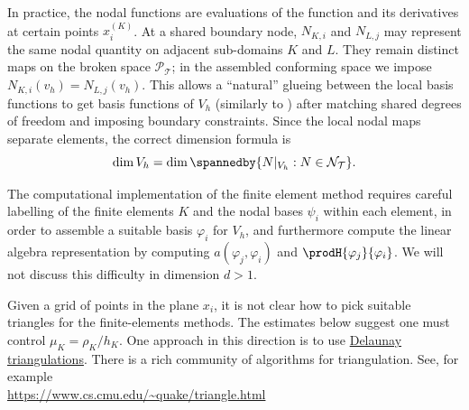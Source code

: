 \begin{remark}
    In practice, the nodal functions are evaluations of the function and its derivatives at certain points $x_i^{(K)}$. At a shared boundary node, $N_{K,i}$ and $N_{L,j}$ may represent the same nodal quantity on adjacent sub-domains $K$ and $L$. They remain distinct maps on the broken space $\mathcal P_{\mathcal T}$; in the assembled conforming space we impose $N_{K,i}(v_h) = N_{L,j}(v_h)$.
    This allows a ``natural'' glueing between the local basis functions to get basis functions of $V_h$ (similarly to )
    after matching shared degrees of freedom and imposing boundary constraints. Since the local nodal maps separate elements, the correct dimension formula is
    \begin{equation*}
        \dim V_h = \dim\spannedby\{N|_{V_h}:N\in\mathcal N_{\mathcal T}\}.
    \end{equation*}



    The computational implementation of the finite element method requires careful labelling of the finite elements $K$ and the nodal bases $\psi_i$ within each element, in order to assemble a suitable basis $\varphi_i$ for $V_h$, and furthermore compute the linear algebra representation by computing $a(\varphi_j,\varphi_i)$ and $\prodH{\varphi_j}{\varphi_i}$.
    We will not discuss this difficulty in dimension $d > 1$.
\end{remark}


\begin{remark}[On triangulations]
    Given a grid of points in the plane $x_i$, it is not clear how to pick suitable triangles for the finite-elements methods.
    The estimates below suggest one must control $\mu_K = \rho_K / h_K$.
    One approach in this direction is to use \href{https://en.wikipedia.org/wiki/Delaunay_triangulation}{Delaunay triangulations}.
    There is a rich community of algorithms for triangulation. See, for example
    \\
    \url{https://www.cs.cmu.edu/~quake/triangle.html}
\end{remark}

